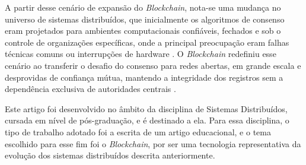 
A partir desse cenário de expansão do \textit{Blockchain}, nota-se uma mudança no universo de sistemas distribuídos, que inicialmente os algoritmos de consenso eram projetados para ambientes computacionais confiáveis, fechados e sob o controle de organizações específicas, onde a principal preocupação eram falhas técnicas comuns ou interrupções de hardware \cite{Li2021}. O \textit{Blockchain} redefiniu esse cenário ao transferir o desafio do consenso para redes abertas, em grande escala e desprovidas de confiança mútua, mantendo a integridade dos registros sem a dependência exclusiva de autoridades centrais \cite{Xiao2020}.


Este artigo foi desenvolvido no âmbito da disciplina de Sistemas Distribuídos, cursada em nível de pós-graduação, e é destinado a ela. Para essa disciplina, o tipo de trabalho adotado foi a escrita de um artigo educacional, e o tema escolhido para esse fim foi o \textit{Blockchain}, por ser uma tecnologia representativa da evolução dos sistemas distribuídos descrita anteriormente.
